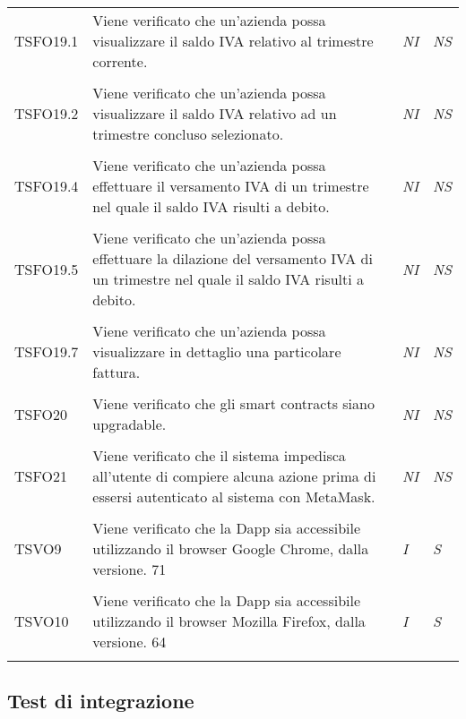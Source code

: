 \begin{longtable}{ >{\centering}p{} >{}p{}
			>{\centering}p{} >{\centering}p{}}
		\tabularnewline
		\hypertarget{TSFO19.1}{TSFO19.1} & Viene verificato che un'azienda possa 
		visualizzare il saldo IVA relativo al trimestre corrente. & 
		\textit{NI} & \textit{NS}\\ 

		\tabularnewline
		\hypertarget{TSFO19.2}{TSFO19.2} & Viene verificato che un'azienda possa 
		visualizzare il saldo IVA relativo ad un trimestre concluso selezionato. & 
		\textit{NI} & \textit{NS}\\ 

		\tabularnewline
		\hypertarget{TSFO19.4}{TSFO19.4} & Viene verificato che un'azienda possa 
		effettuare il versamento IVA di un trimestre nel quale il saldo IVA risulti a 
		debito. & \textit{NI} & \textit{NS}\\ 

		\tabularnewline
		\hypertarget{TSFO19.5}{TSFO19.5} & Viene verificato che un'azienda possa 
		effettuare la dilazione del versamento IVA di un trimestre nel quale il saldo 
		IVA risulti a debito. & \textit{NI} & \textit{NS}\\ 

		\tabularnewline
		\hypertarget{TSFO19.7}{TSFO19.7} & Viene verificato che un'azienda possa 
		visualizzare in dettaglio una particolare fattura. & \textit{NI} & \textit{NS}\\ 

		\tabularnewline
		\hypertarget{TSFO20}{TSFO20} & Viene verificato che gli smart contracts siano 
		upgradable. & \textit{NI} & \textit{NS}\\ 

		\tabularnewline
		\hypertarget{TSFO21}{TSFO21} & Viene verificato che il sistema impedisca 
		all'utente di compiere alcuna azione prima di essersi autenticato al sistema con 
		MetaMask. & \textit{NI} & \textit{NS}\\ 

		\tabularnewline
		\hypertarget{TSVO9}{TSVO9} & Viene verificato che la Dapp sia accessibile 
		utilizzando il browser Google Chrome, dalla versione. 71 & 
		\textit{I} & \textit{S}\\

		\tabularnewline
		\hypertarget{TSVO10}{TSVO10} & Viene verificato che la Dapp sia accessibile 
		utilizzando il browser Mozilla Firefox, dalla versione. 64 & \textit{I} 
		& \textit{S}\\  
		\tabularnewline
		\end{longtable}


\subsection{Test di integrazione}
	\renewcommand{\arraystretch}{1.5}
		
